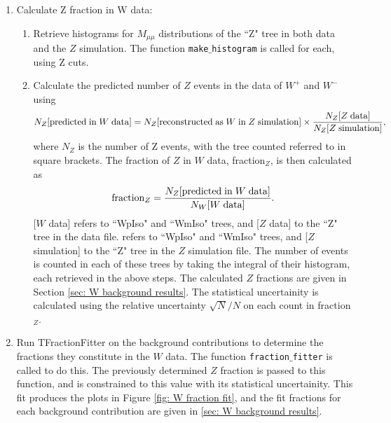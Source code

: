 \documentclass[a4paper]{article}
\begin{document}
\begin{enumerate}
    \item Calculate Z fraction in W data:
    \begin{enumerate}
        \item Retrieve histograms for $M_{\mu\mu}$ distributions of the ``Z" tree in both data and the $Z$ simulation. The function \texttt{make$\_$histogram} is called for each, using Z cuts.
        \item Calculate the predicted number of $Z$ events in the data of $W^+$ and $W^-$ using
        \begin{equation}
            N_Z[{\rm predicted \; in \;} W {\rm\; data}] = N_Z[{\rm reconstructed \; as \;} W {\rm \; in \;} Z {\rm \; simulation}] \times \frac{N_Z[Z {\rm \; data}]}{N_Z[Z {\rm\; simulation}]},
        \end{equation}
        where $N_Z$ is the number of Z events, with the tree counted referred to in square brackets. The fraction of $Z$ in $W$ data, fraction$_Z$, is then calculated as
        \begin{equation}
            {\rm fraction}_Z = \frac{N_Z[{\rm predicted \; in \;} W {\rm\; data}]}{N_W[W {\rm \; data}]}.
        \end{equation}
        [$W$ data] refers to ``WpIso" and ``WmIso" trees, and [$Z$ data] to the ``Z" tree in the data file.  refers to ``WpIso" and ``WmIso" trees, and [$Z$ simulation] to the ``Z" tree in the $Z$ simulation file. \newline 
        The number of events is counted in each of these trees by taking the integral of their histogram, each retrieved in the above steps. \newline
        The calculated $Z$ fractions are given in Section \ref{sec: W background results}.
        The statistical uncertainity is calculated using the relative uncertainty $\sqrt{N}/N$ on each count in fraction$_Z$.
    \end{enumerate}
    
    \item Run TFractionFitter on the background contributions to determine the fractions they constitute in the $W$ data. The function \texttt{fraction$\_$fitter} is called to do this. The previously determined $Z$ fraction is passed to this function, and is constrained to this value with its statistical uncertainity. \newline
    This fit produces the plots in Figure \ref{fig: W fraction fit}, and the fit fractions for each background contribution are given in \ref{sec: W background results}.
    

\end{enumerate}
\end{document}
